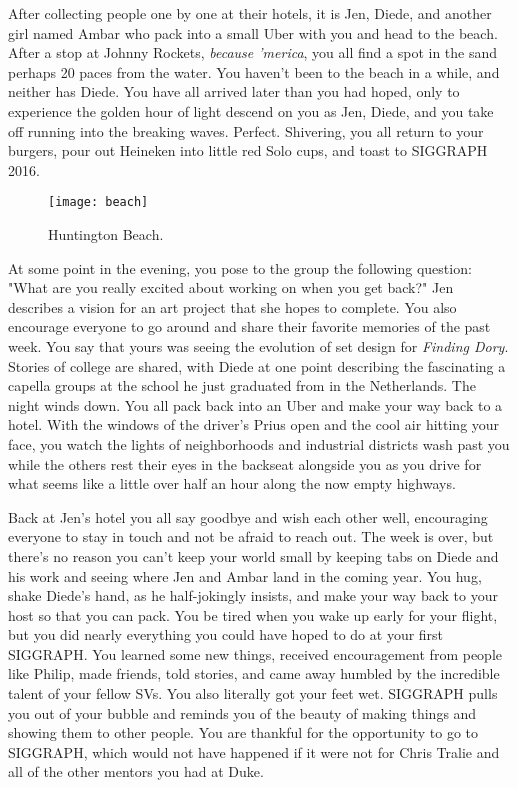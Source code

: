 \documentclass[../main.tex]{subfiles}
\begin{document}
After collecting people one by one at their hotels, it is Jen, Diede, and another girl named Ambar who pack into a small Uber with you and head to the beach. After a stop at Johnny Rockets, \textit{because 'merica}, you all find a spot in the sand perhaps 20 paces from the water. You haven't been to the beach in a while, and neither has Diede. You have all arrived later than you had hoped, only to experience the golden hour of light descend on you as Jen, Diede, and you take off running into the breaking waves. Perfect. Shivering, you all return to your burgers, pour out Heineken into little red Solo cups, and toast to SIGGRAPH 2016.

\begin{figure}[h!]
	\centering
	\texttt{[image: beach]}
	\caption*{Huntington Beach.}
\end{figure}

At some point in the evening, you pose to the group the following question: "What are you really excited about working on when you get back?" Jen describes a vision for an art project that she hopes to complete. You also encourage everyone to go around and share their favorite memories of the past week. You say that yours was seeing the evolution of set design for \textit{Finding Dory}. Stories of college are shared, with Diede at one point describing the fascinating a capella groups at the school he just graduated from in the Netherlands. The night winds down. You all pack back into an Uber and make your way back to a hotel. With the windows of the driver's Prius open and the cool air hitting your face, you watch the lights of neighborhoods and industrial districts wash past you while the others rest their eyes in the backseat alongside you as you drive for what seems like a little over half an hour along the now empty highways.

Back at Jen's hotel you all say goodbye and wish each other well, encouraging everyone to stay in touch and not be afraid to reach out. The week is over, but there's no reason you can't keep your world small by keeping tabs on Diede and his work and seeing where Jen and Ambar land in the coming year. You hug, shake Diede's hand, as he half-jokingly insists, and make your way back to your host so that you can pack. You be tired when you wake up early for your flight,  but you did nearly everything you could have hoped to do at your first SIGGRAPH. You learned some new things, received encouragement from people like Philip, made friends, told stories, and came away humbled by the incredible talent of your fellow SVs. You also literally got your feet wet. SIGGRAPH pulls you out of your bubble and reminds you of the beauty of making things and showing them to other people.  You are thankful for the opportunity to go to SIGGRAPH, which would not have happened if it were not for Chris Tralie and all of the other mentors you had at Duke.
\end{document}
